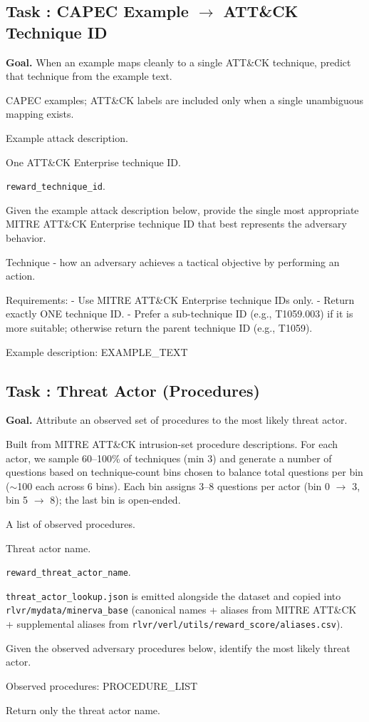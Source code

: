 \documentclass[11pt]{article}
\newcounter{task}
\newcommand{\tasksection}[1]{%
  \refstepcounter{task}%
  \subsection*{Task \thetask: #1}%
}
\newenvironment{taskmeta}{%
  \begin{description}[
      style=nextline,
      leftmargin=3.0cm,
      labelwidth=2.7cm,
      itemsep=0.15em,
      topsep=0.25em
  ]%
}{\end{description}}
\begin{document}
\tasksection{CAPEC Example $\rightarrow$ ATT\&CK Technique ID}
\textbf{Goal.} When an example maps cleanly to a single ATT\&CK technique, predict that technique from the example text.
\begin{taskmeta}
  \item[Source] CAPEC examples; ATT\&CK labels are included only when a single unambiguous mapping exists.
  \item[Input] Example attack description.
  \item[Output] One ATT\&CK Enterprise technique ID.
  \item[Reward] \texttt{reward\_technique\_id}.
\end{taskmeta}
\begin{promptbox}
Given the example attack description below, provide the single most appropriate MITRE ATT&CK Enterprise technique ID that best represents the adversary behavior.

Technique - how an adversary achieves a tactical objective by performing an action.

Requirements:
- Use MITRE ATT&CK Enterprise technique IDs only.
- Return exactly ONE technique ID.
- Prefer a sub-technique ID (e.g., T1059.003) if it is more suitable; otherwise return the parent technique ID (e.g., T1059).

Example description:
{EXAMPLE_TEXT}
\end{promptbox}


\tasksection{Threat Actor (Procedures)}
\textbf{Goal.} Attribute an observed set of procedures to the most likely threat actor.
\begin{taskmeta}
  \item[Source] Built from MITRE ATT\&CK intrusion-set procedure descriptions. For each actor, we sample 60--100\% of techniques (min 3) and generate a number of questions based on technique-count bins chosen to balance total questions per bin ($\sim$100 each across 6 bins). Each bin assigns 3--8 questions per actor (bin 0 $\rightarrow$ 3, bin 5 $\rightarrow$ 8); the last bin is open-ended.
  \item[Input] A list of observed procedures.
  \item[Output] Threat actor name.
  \item[Reward] \texttt{reward\_threat\_actor\_name}.
  \item[Lookup] \texttt{threat\_actor\_lookup.json} is emitted alongside the dataset and copied into \texttt{rlvr/mydata/minerva\_base} (canonical names + aliases from MITRE ATT\&CK + supplemental aliases from \texttt{rlvr/verl/utils/reward\_score/aliases.csv}).
\end{taskmeta}
\begin{promptbox}
Given the observed adversary procedures below, identify the most likely threat actor.

Observed procedures:
{PROCEDURE_LIST}

Return only the threat actor name.
\end{promptbox}
\end{document}
